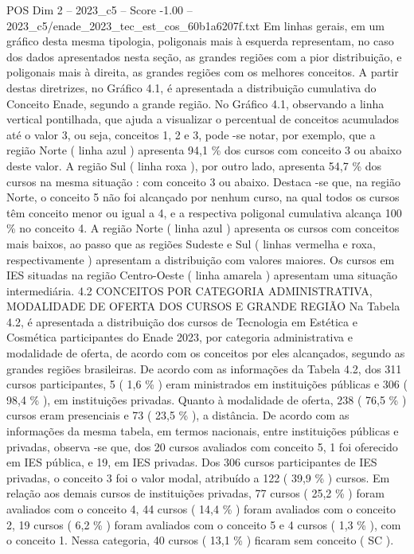 \begin{textsample}{POS Dim 2 – 2023\_c5 – Score -1.00 – 2023\_c5/enade\_2023\_tec\_est\_cos\_60b1a6207f.txt}
Em linhas gerais, em um gráfico desta mesma tipologia, poligonais mais à esquerda representam, no caso dos dados apresentados nesta seção, as grandes regiões com a pior distribuição, e poligonais mais à direita, as grandes regiões com os melhores conceitos.
A partir destas diretrizes, no Gráfico 4.1, é apresentada a distribuição cumulativa do Conceito Enade, segundo a grande região.
No Gráfico 4.1, observando a linha vertical pontilhada, que ajuda a visualizar o percentual de conceitos acumulados até o valor 3, ou seja, conceitos 1, 2 e 3, pode -se notar, por exemplo, que a região Norte ( linha azul ) apresenta 94,1 \% dos cursos com conceito 3 ou abaixo deste valor.
A região Sul ( linha roxa ), por outro lado, apresenta 54,7 \% dos cursos na mesma situação : com conceito 3 ou abaixo.
Destaca -se que, na região Norte, o conceito 5 não foi alcançado por nenhum curso, na qual todos os cursos têm conceito menor ou igual a 4, e a respectiva poligonal cumulativa alcança 100 \% no conceito 4.
A região Norte ( linha azul ) apresenta os cursos com conceitos mais baixos, ao passo que as regiões Sudeste e Sul ( linhas vermelha e roxa, respectivamente ) apresentam a distribuição com valores maiores.
Os cursos em IES situadas na região Centro-Oeste ( linha amarela ) apresentam uma situação intermediária. 4.2 CONCEITOS POR CATEGORIA ADMINISTRATIVA, MODALIDADE DE OFERTA DOS CURSOS E GRANDE REGIÃO Na Tabela 4.2, é apresentada a distribuição dos cursos de Tecnologia em Estética e Cosmética participantes do Enade 2023, por categoria administrativa e modalidade de oferta, de acordo com os conceitos por eles alcançados, segundo as grandes regiões brasileiras.
De acordo com as informações da Tabela 4.2, dos 311 cursos participantes, 5 ( 1,6 \% ) eram ministrados em instituições públicas e 306 ( 98,4 \% ), em instituições privadas.
Quanto à modalidade de oferta, 238 ( 76,5 \% ) cursos eram presenciais e 73 ( 23,5 \% ), a distância.
De acordo com as informações da mesma tabela, em termos nacionais, entre instituições públicas e privadas, observa -se que, dos 20 cursos avaliados com conceito 5, 1 foi oferecido em IES pública, e 19, em IES privadas.
Dos 306 cursos participantes de IES privadas, o conceito 3 foi o valor modal, atribuído a 122 ( 39,9 \% ) cursos.
Em relação aos demais cursos de instituições privadas, 77 cursos ( 25,2 \% ) foram avaliados com o conceito 4, 44 cursos ( 14,4 \% ) foram avaliados com o conceito 2, 19 cursos ( 6,2 \% ) foram avaliados com o conceito 5 e 4 cursos ( 1,3 \% ), com o conceito 1.
Nessa categoria, 40 cursos ( 13,1 \% ) ficaram sem conceito ( SC ).

\end{textsample}
